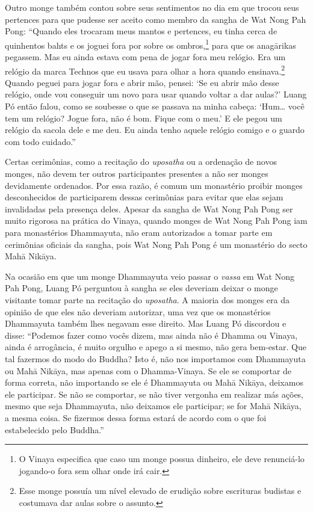 Outro monge também contou sobre seus sentimentos no dia em que trocou
seus pertences para que pudesse ser aceito como membro da sangha de Wat
Nong Pah Pong: ``Quando eles trocaram meus mantos e pertences, eu tinha
cerca de quinhentos bahts e os joguei fora por sobre os ombros,\footnote{O
  Vinaya especifica que caso um monge possua dinheiro, ele deve
  renunciá-lo jogando-o fora sem olhar onde irá cair.} para que os
anagārikas pegassem. Mas eu ainda estava com pena de jogar fora meu
relógio. Era um relógio da marca Technos que eu usava para olhar a hora
quando ensinava.\footnote{Esse monge possuía um nível elevado de erudição
  sobre escrituras budistas e costumava dar aulas sobre o assunto.}
Quando peguei para jogar fora e abrir mão, pensei: `Se eu abrir mão
desse relógio, onde vou conseguir um novo para usar quando voltar a dar
aulas?' Luang Pó então falou, como se soubesse o que se passava na minha
cabeça: `Hum\ldots{} você tem um relógio? Jogue fora, não é bom. Fique
com o meu.' E ele pegou um relógio da sacola dele e me deu. Eu ainda
tenho aquele relógio comigo e o guardo com todo cuidado.''

Certas cerimônias, como a recitação do \emph{uposatha} ou a ordenação de
novos monges, não devem ter outros participantes presentes a não ser
monges devidamente ordenados. Por essa razão, é comum um monastério
proibir monges desconhecidos de participarem dessas cerimônias para
evitar que elas sejam invalidadas pela presença deles. Apesar da sangha
de Wat Nong Pah Pong ser muito rigorosa na prática do Vinaya, quando
monges de Wat Nong Pah Pong iam para monastérios Dhammayuta, não eram
autorizados a tomar parte em cerimônias oficiais da sangha, pois Wat
Nong Pah Pong é um monastério do secto Mahā Nikāya.

Na ocasião em que um monge Dhammayuta veio passar o \emph{vassa} em Wat
Nong Pah Pong, Luang Pó perguntou à sangha se eles deveriam deixar o
monge visitante tomar parte na recitação do \emph{uposatha}. A maioria
dos monges era da opinião de que eles não deveriam autorizar, uma vez
que os monastérios Dhammayuta também lhes negavam esse direito. Mas
Luang Pó discordou e disse: ``Podemos fazer como vocês dizem, mas ainda
não é Dhamma ou Vinaya, ainda é arrogância, é muito orgulho e apego a si
mesmo, não gera bem-estar. Que tal fazermos do modo do Buddha? Isto é,
não nos importamos com Dhammayuta ou Mahā Nikāya, mas apenas com o
Dhamma-Vinaya. Se ele se comportar de forma correta, não importando se
ele é Dhammayuta ou Mahā Nikāya, deixamos ele participar. Se não se
comportar, se não tiver vergonha em realizar más ações, mesmo que seja
Dhammayuta, não deixamos ele participar; se for Mahā Nikāya, a mesma
coisa. Se fizermos dessa forma estará de acordo com o que foi
estabelecido pelo Buddha.''

